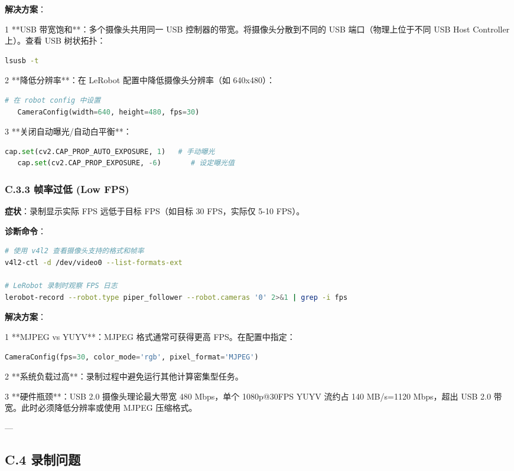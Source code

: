 \documentclass[UTF8,a4paper,11pt]{ctexart}
\begin{document}
{\textbf{解决方案}：
\item[1] **USB 带宽饱和**：多个摄像头共用同一 USB 控制器的带宽。将摄像头分散到不同的 USB 端口（物理上位于不同 USB Host Controller 上）。查看 USB 树状拓扑：
\begin{lstlisting}[language=bash]
   lsusb -t
\end{lstlisting}
\item[2] **降低分辨率**：在 LeRobot 配置中降低摄像头分辨率（如 640x480）：
\begin{lstlisting}[language=python]
   # 在 robot config 中设置
   CameraConfig(width=640, height=480, fps=30)
\end{lstlisting}
\item[3] **关闭自动曝光/自动白平衡**：
\begin{lstlisting}[language=python]
   cap.set(cv2.CAP_PROP_AUTO_EXPOSURE, 1)   # 手动曝光
   cap.set(cv2.CAP_PROP_EXPOSURE, -6)       # 设定曝光值
\end{lstlisting}

\subsubsection{C.3.3 帧率过低 (Low FPS)}

\textbf{症状}：录制显示实际 FPS 远低于目标 FPS（如目标 30 FPS，实际仅 5-10 FPS）。

\textbf{诊断命令}：
\begin{lstlisting}[language=bash]
# 使用 v4l2 查看摄像头支持的格式和帧率
v4l2-ctl -d /dev/video0 --list-formats-ext

# LeRobot 录制时观察 FPS 日志
lerobot-record --robot.type piper_follower --robot.cameras '0' 2>&1 | grep -i fps
\end{lstlisting}

\textbf{解决方案}：
\item[1] **MJPEG vs YUYV**：MJPEG 格式通常可获得更高 FPS。在配置中指定：
\begin{lstlisting}[language=python]
   CameraConfig(fps=30, color_mode='rgb', pixel_format='MJPEG')
\end{lstlisting}
\item[2] **系统负载过高**：录制过程中避免运行其他计算密集型任务。
\item[3] **硬件瓶颈**：USB 2.0 摄像头理论最大带宽 480 Mbps，单个 1080p@30FPS YUYV 流约占 140 MB/s=1120 Mbps，超出 USB 2.0 带宽。此时必须降低分辨率或使用 MJPEG 压缩格式。

---

\subsection{C.4 录制问题}

}
\end{document}
